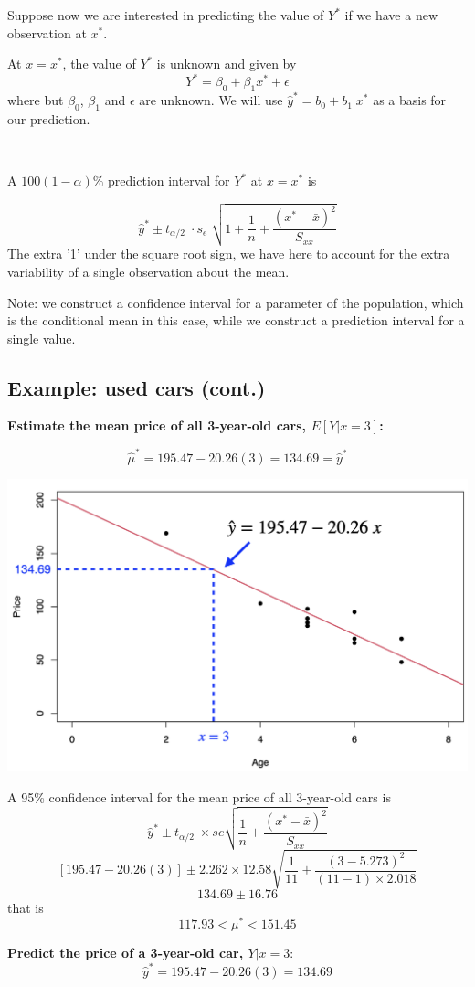 \documentclass[
]{article}
\begin{document}
Suppose now we are interested in predicting the value of \(Y^*\) if we
have a new observation at \(x^*\).

At \(x=x^*\), the value of \(Y^*\) is unknown and given by
\[Y^*=\beta_0+\beta_1 x^*+\epsilon\] where but \(\beta_0\), \(\beta_1\)
and \(\epsilon\) are unknown. We will use \(\hat{y}^*=b_0+b_1\;x^*\) as
a basis for our prediction.

\(~\)

A \(100(1-\alpha)\%\) prediction interval for \(Y^*\) at \(x=x^*\) is

\[\hat{y}^* \pm t_{\alpha/2}\;\cdot s_e\;\sqrt{1+\frac{1}{n}+\frac{(x^*-\bar{x})^2}{S_{xx}}}\]
The extra '1' under the square root sign, we have here to account for
the extra variability of a single observation about the mean.

Note: we construct a confidence interval for a parameter of the
population, which is the conditional mean in this case, while we
construct a prediction interval for a single value.

\hypertarget{example-used-cars-cont.}{%
\subsection{Example: used cars (cont.)}\label{example-used-cars-cont.}}

\textbf{Estimate the mean price of all 3-year-old cars, \(E[Y|x=3]\):}

\[\hat{\mu}^*=195.47-20.26 (3)= 134.69=\hat{y}^*\]

\begin{center}\includegraphics[width=0.4\linewidth,height=0.4\textheight]{figures/predex} \end{center}

A 95\% confidence interval for the mean price of all 3-year-old cars is
\[\hat{y}^*\pm t_{\alpha/2}\;\times se\sqrt{\frac{1}{n}+\frac{(x^*-\bar{x})^2}{S_{xx}}}\]
\[[195.47-20.26(3)]\pm 2.262\times12.58\sqrt{\frac{1}{11}+\frac{(3-5.273)^2}{(11-1)\times2.018}}\]
\[134.69\pm 16.76\] that is \[117.93<\mu^*<151.45\]

\textbf{Predict the price of a 3-year-old car, \(Y|x=3\)}:
\[\hat{y}^*=195.47-20.26 (3)= 134.69\]
\end{document}
